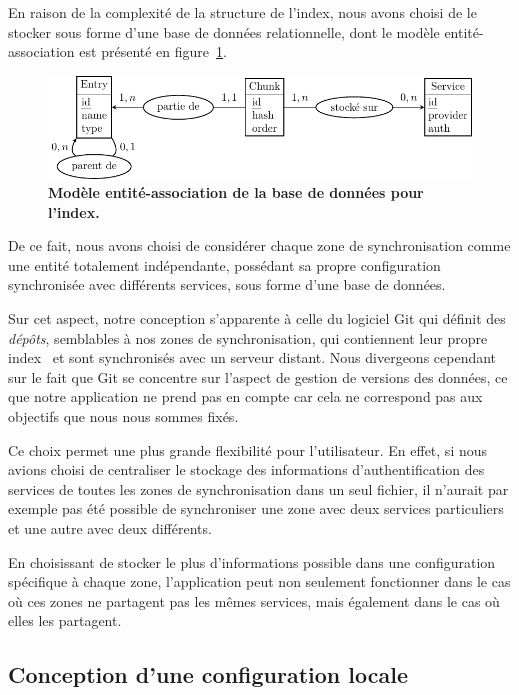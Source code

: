 En raison de la complexité de la structure de l'index, nous avons choisi de le stocker sous forme d'une base de données relationnelle, dont le modèle entité-association est présenté en figure~\ref{fig:conception-base}.

\begin{figure}[h!]
    \centering
    \includegraphics{figures/base}
    \caption[Modèle entité-association de la base de données de l'index]{\textbf{Modèle entité-association de la base de données pour l'index.}}
    \label{fig:conception-base}
\end{figure}

De ce fait, nous avons choisi de considérer chaque zone de synchronisation comme une entité totalement indépendante, possédant sa propre configuration synchronisée avec différents services, sous forme d'une base de données.

Sur cet aspect, notre conception s'apparente à celle du logiciel Git qui définit des \emph{dépôts}, semblables à nos zones de synchronisation, qui contiennent leur propre index~\parencite{rosenberg2010} et sont synchronisés avec un serveur distant. Nous divergeons cependant sur le fait que Git se concentre sur l'aspect de gestion de versions des données, ce que notre application ne prend pas en compte car cela ne correspond pas aux objectifs que nous nous sommes fixés.

Ce choix permet une plus grande flexibilité pour l'utilisateur. En effet, si nous avions choisi de centraliser le stockage des informations d'authentification des services de toutes les zones de synchronisation dans un seul fichier, il n'aurait par exemple pas été possible de synchroniser une zone avec deux services particuliers et une autre avec deux différents.

En choisissant de stocker le plus d'informations possible dans une configuration spécifique à chaque zone, l'application peut non seulement fonctionner dans le cas où ces zones ne partagent pas les mêmes services, mais également dans le cas où elles les partagent.

\subsection{Conception d'une configuration locale}

